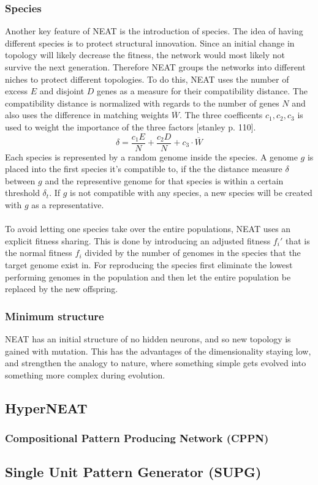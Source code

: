 \documentclass[11pt, a4paper]{article}
\begin{document}
\subsubsection{Species}
Another key feature of NEAT is the introduction  of species. The idea of having different species is to protect structural innovation. Since an initial change in topology will likely decrease the fitness, the network would most likely not survive the next generation. Therefore NEAT groups the networks into different niches to protect different topologies. To do this, NEAT uses the number of excess $ E $ and disjoint $ D $ genes as a measure for their compatibility distance. The compatibility distance is normalized with regards to the number of genes $ N $ and also uses the difference in matching weights $ \overline{W} $. The three coefficents $ c_1, c_2, c_3$ is used to weight the importance of the three factors [stanley p. 110].
\begin{equation}
\delta = \dfrac{c_1E}{N}+\dfrac{c_2D}{N}+c_3\cdot\overline{W}
\end{equation}
Each species is represented by a random genome inside the species. A genome $ g $ is placed into the first species it's compatible to, if the the distance measure $ \delta $ between $ g $ and the representive genome for that species is within a certain threshold $ \delta_t $. If $ g $ is not compatible with any species, a new species will be created with $ g $ as a representative.
\\
\\
To avoid letting one species take over the entire populations, NEAT uses an explicit fitness sharing. This is done by introducing an adjusted fitness $ f_i'$ that is the normal fitness $ f_i $ divided by the number of genomes in the species that the target genome exist in. For reproducing the species first eliminate the lowest performing genomes in the population and then let the entire population be replaced by the new offspring.
\subsubsection{Minimum structure}
NEAT has an initial structure of no hidden neurons, and  so new topology is gained with mutation. This has the advantages of the dimensionality staying low, and strengthen the analogy to nature, where something simple gets evolved into something more complex during evolution.
\subsection{HyperNEAT}
\subsubsection{Compositional Pattern Producing Network (CPPN)}
\subsection{Single Unit Pattern Generator (SUPG)}
\end{document}

